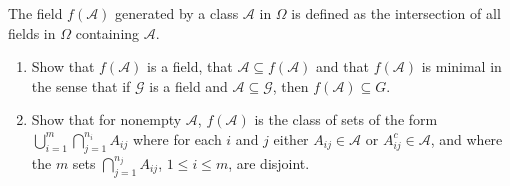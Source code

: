 \documentclass[12pt]{article}
\newcommand{\A}{\mathcal{A}}
\newcommand{\G}{\mathcal{G}}
\newcommand{\seq}{\subseteq}
\newcommand{\Om}{\Omega}
\newenvironment{exercise}[2][Exercise]{\begin{trivlist}
\item[\hskip \labelsep {\bfseries #1}\hskip \labelsep {\bfseries #2.}]}{\end{trivlist}}
\begin{document}
\begin{exercise}{2.5}
    The field $f (\A)$ generated by a class $\A$ in $\Om$ is defined as the intersection of all fields in $\Om$ containing $\A$.
    \begin{enumerate}
        \item Show that $f(\A)$ is a field, that $\A \seq f(\A)$ and that $f(\A)$ is minimal in the sense that if $\G$ is a field and $\A \seq \G$, then $f(\A) \seq G$.
        \item Show that for nonempty $\A$, $f(\A)$ is the class of sets of the form $\bigcup_{i=1}^{m} \bigcap_{j=1}^{n_i} A_{ij}$ where for each $i$ and $j$ either $A_{ij} \in \A$ or $A_{ij}^{c} \in \A$, and where the $m$ sets $\bigcap_{j=1}^{n_j} A_{ij}$, $1 \leq i \leq m$, are disjoint.
    \end{enumerate}
\end{exercise}
\end{document}
